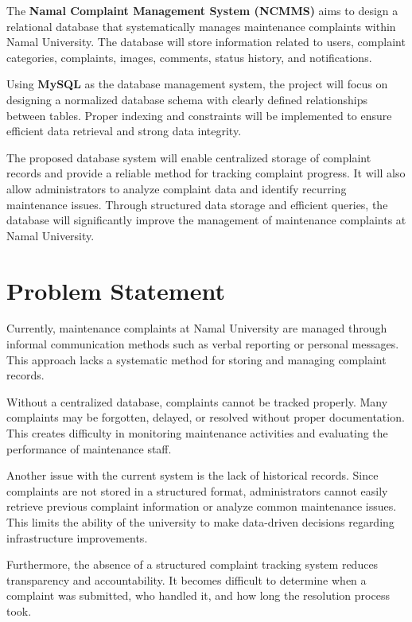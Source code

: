 \documentclass[12pt,a4paper]{article}
\begin{document}
The \textbf{Namal Complaint Management System (NCMMS)} aims to design a relational database that systematically manages maintenance complaints within Namal University. The database will store information related to users, complaint categories, complaints, images, comments, status history, and notifications.

Using \textbf{MySQL} as the database management system, the project will focus on designing a normalized database schema with clearly defined relationships between tables. Proper indexing and constraints will be implemented to ensure efficient data retrieval and strong data integrity.

The proposed database system will enable centralized storage of complaint records and provide a reliable method for tracking complaint progress. It will also allow administrators to analyze complaint data and identify recurring maintenance issues. Through structured data storage and efficient queries, the database will significantly improve the management of maintenance complaints at Namal University.


\section{Problem Statement}

Currently, maintenance complaints at Namal University are managed through informal communication methods such as verbal reporting or personal messages. This approach lacks a systematic method for storing and managing complaint records.

Without a centralized database, complaints cannot be tracked properly. Many complaints may be forgotten, delayed, or resolved without proper documentation. This creates difficulty in monitoring maintenance activities and evaluating the performance of maintenance staff.

Another issue with the current system is the lack of historical records. Since complaints are not stored in a structured format, administrators cannot easily retrieve previous complaint information or analyze common maintenance issues. This limits the ability of the university to make data-driven decisions regarding infrastructure improvements.

Furthermore, the absence of a structured complaint tracking system reduces transparency and accountability. It becomes difficult to determine when a complaint was submitted, who handled it, and how long the resolution process took.
\end{document}
